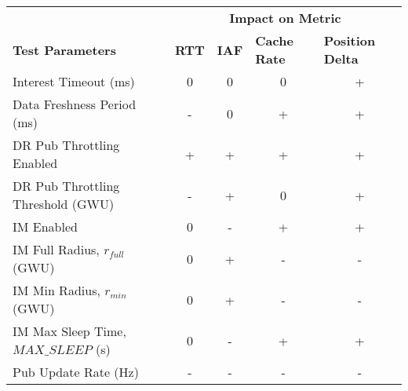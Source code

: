 \begin{table}[H]
    \centering
    \begin{tabular}{@{}lcccc@{}}
        & \multicolumn{4}{c}{\textbf{Impact on Metric}}                                                                                                               \\
    \multirow{-2}{*}{\textbf{Test Parameters}} & \multicolumn{1}{l}{\textbf{RTT}} & \multicolumn{1}{l}{\textbf{IAF}} & \multicolumn{1}{l}{\textbf{Cache Rate}} & \multicolumn{1}{l}{\textbf{Position Delta}} \\
    Interest Timeout (ms)                      & 0                                & 0                                & 0                                       & \cellcolor[HTML]{FFCCC9}+                   \\
    Data Freshness Period (ms)                 & \cellcolor[HTML]{9AFF99}-        & 0                                & \cellcolor[HTML]{9AFF99}+               & \cellcolor[HTML]{FFCCC9}+                   \\
    DR Pub Throttling Enabled                  & \cellcolor[HTML]{FFCCC9}+        & \cellcolor[HTML]{9AFF99}+        & \cellcolor[HTML]{9AFF99}+               & \cellcolor[HTML]{FFCCC9}+                   \\
    DR Pub Throttling Threshold (GWU)          & \cellcolor[HTML]{9AFF99}-        & \cellcolor[HTML]{9AFF99}+        & 0                                       & \cellcolor[HTML]{FFCCC9}+                   \\
    IM Enabled                                 & 0                                & \cellcolor[HTML]{FFCCC9}-        & \cellcolor[HTML]{9AFF99}+               & \cellcolor[HTML]{FFCCC9}+                   \\
    IM Full Radius, $r_{full}$ (GWU)              & 0                                & \cellcolor[HTML]{9AFF99}+        & \cellcolor[HTML]{FFCCC9}-               & \cellcolor[HTML]{9AFF99}-                   \\
    IM Min Radius, $r_{min}$ (GWU)                & 0                                & \cellcolor[HTML]{9AFF99}+        & \cellcolor[HTML]{FFCCC9}-               & \cellcolor[HTML]{9AFF99}-                   \\
    IM Max Sleep Time, $MAX\_SLEEP$ (s)          & 0                                & \cellcolor[HTML]{FFCCC9}-        & \cellcolor[HTML]{9AFF99}+               & \cellcolor[HTML]{FFCCC9}+                   \\
    Pub Update Rate (Hz)                           & \cellcolor[HTML]{FFCCC9}-        & \cellcolor[HTML]{FFCCC9}-        & \cellcolor[HTML]{FFCCC9}-               & \cellcolor[HTML]{9AFF99}-                   \\

\end{tabular}
\end{table}
